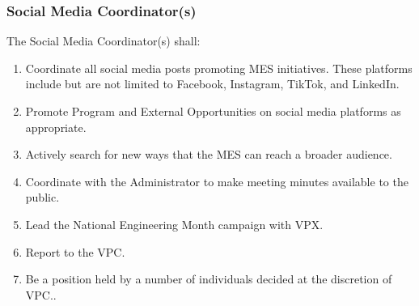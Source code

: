 \subsubsection{Social Media Coordinator(s)}
\label{social-media-coordinators}
The Social Media Coordinator(s) shall:

\begin{enumerate}
 \item
  Coordinate all social media posts promoting MES initiatives. These platforms include but are not limited to Facebook, Instagram, TikTok, and LinkedIn.
 \item
  Promote Program and External Opportunities on social media platforms as appropriate.
 \item
  Actively search for new ways that the MES can reach a broader audience.
 \item
  Coordinate with the Administrator to make meeting minutes available to the public.
 \item
  Lead the National Engineering Month campaign with VPX.
 \item
  Report to the VPC.
 \item
  Be a position held by a number of individuals decided at the discretion of VPC..

\end{enumerate}